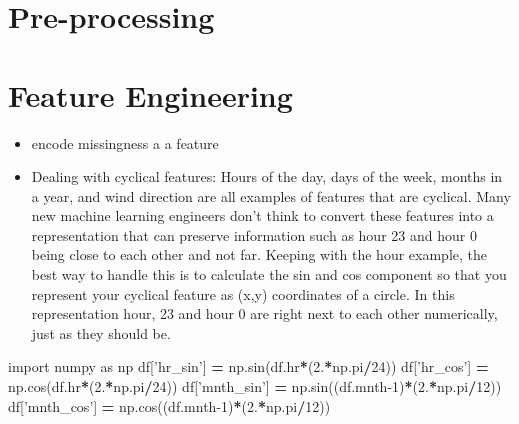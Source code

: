 \documentclass[]{book}
\newenvironment{Shaded}{\begin{snugshade}}{\end{snugshade}}
\newcommand{\DecValTok}[1]{\textcolor[rgb]{0.00,0.00,0.81}{#1}}
\newcommand{\FloatTok}[1]{\textcolor[rgb]{0.00,0.00,0.81}{#1}}
\newcommand{\ImportTok}[1]{#1}
\newcommand{\NormalTok}[1]{#1}
\newcommand{\OperatorTok}[1]{\textcolor[rgb]{0.81,0.36,0.00}{\textbf{#1}}}
\newcommand{\StringTok}[1]{\textcolor[rgb]{0.31,0.60,0.02}{#1}}
\begin{document}
\hypertarget{pre-processing}{%
\section{Pre-processing}\label{pre-processing}}

\hypertarget{feature-engineering}{%
\section{Feature Engineering}\label{feature-engineering}}

\begin{itemize}
\item
  encode missingness a a feature
\item
  Dealing with cyclical features: Hours of the day, days of the week, months in a year, and wind direction are all examples of features that are cyclical. Many new machine learning engineers don't think to convert these features into a representation that can preserve information such as hour 23 and hour 0 being close to each other and not far. Keeping with the hour example, the best way to handle this is to calculate the sin and cos component so that you represent your cyclical feature as (x,y) coordinates of a circle. In this representation hour, 23 and hour 0 are right next to each other numerically, just as they should be.
\end{itemize}

\begin{Shaded}
\begin{Highlighting}[]
\ImportTok{import}\NormalTok{ numpy }\ImportTok{as}\NormalTok{ np}
\NormalTok{df[}\StringTok{'hr_sin'}\NormalTok{] }\OperatorTok{=}\NormalTok{ np.sin(df.hr}\OperatorTok{*}\NormalTok{(}\FloatTok{2.}\OperatorTok{*}\NormalTok{np.pi}\OperatorTok{/}\DecValTok{24}\NormalTok{))}
\NormalTok{df[}\StringTok{'hr_cos'}\NormalTok{] }\OperatorTok{=}\NormalTok{ np.cos(df.hr}\OperatorTok{*}\NormalTok{(}\FloatTok{2.}\OperatorTok{*}\NormalTok{np.pi}\OperatorTok{/}\DecValTok{24}\NormalTok{))}
\NormalTok{df[}\StringTok{'mnth_sin'}\NormalTok{] }\OperatorTok{=}\NormalTok{ np.sin((df.mnth}\DecValTok{-1}\NormalTok{)}\OperatorTok{*}\NormalTok{(}\FloatTok{2.}\OperatorTok{*}\NormalTok{np.pi}\OperatorTok{/}\DecValTok{12}\NormalTok{))}
\NormalTok{df[}\StringTok{'mnth_cos'}\NormalTok{] }\OperatorTok{=}\NormalTok{ np.cos((df.mnth}\DecValTok{-1}\NormalTok{)}\OperatorTok{*}\NormalTok{(}\FloatTok{2.}\OperatorTok{*}\NormalTok{np.pi}\OperatorTok{/}\DecValTok{12}\NormalTok{))}
\end{Highlighting}
\end{Shaded}
\end{document}
